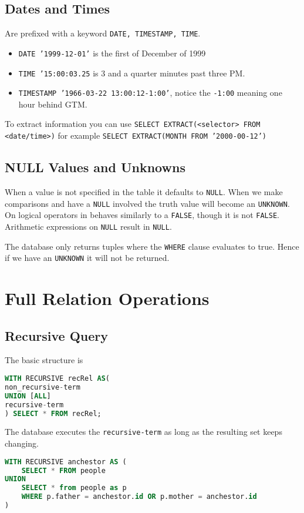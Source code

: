 \documentclass{sciposter}
\newcommand{\TODO}[1]{\todo[inline]{\Large TODO:  #1}}
\renewcommand{\t}[1]{\texttt{#1}}
\begin{document}
\begin{multicols}{3}
\subsection*{Dates and Times}
Are prefixed with a keyword \t{DATE, TIMESTAMP, TIME}.
\begin{itemize}
	\item \t{DATE '1999-12-01'} is the first of December of 1999
	\item \t{TIME '15:00:03.25} is 3 and a quarter minutes past three PM.
	\item \t{TIMESTAMP '1966-03-22 13:00:12-1:00'}, notice the \t{-1:00} meaning one hour behind GTM.
\end{itemize}

To extract information you can use \t{SELECT EXTRACT(<selector> FROM <date/time>)} for example \t{SELECT EXTRACT(MONTH FROM '2000-00-12')}


\subsection*{NULL Values and Unknowns}

When a value is not specified in the table it defaults to \t{NULL}.
When we make comparisons and have a \t{NULL} involved the truth value will become an \t{UNKNOWN}. On logical operators in behaves similarly to a \t{FALSE}, though it is not \t{FALSE}. Arithmetic expressions on \t{NULL} result in \t{NULL}.

The database only returns tuples where the \t{WHERE} clause evaluates to true. Hence if we have an \t{UNKNOWN} it will not be returned.


\section*{Full Relation Operations}

\TODO{...}


\subsection*{Recursive Query}
The basic structure is 
\begin{lstlisting}[language=SQL]
WITH RECURSIVE recRel AS(
non_recursive-term
UNION [ALL]
recursive-term
) SELECT * FROM recRel;
\end{lstlisting}
The database executes the \t{recursive-term} as long as the resulting set keeps changing.
\begin{lstlisting}[language=SQL]
WITH RECURSIVE anchestor AS (
	SELECT * FROM people
UNION
	SELECT * from people as p
	WHERE p.father = anchestor.id OR p.mother = anchestor.id
)


\end{lstlisting}
\end{multicols}
\end{document}
